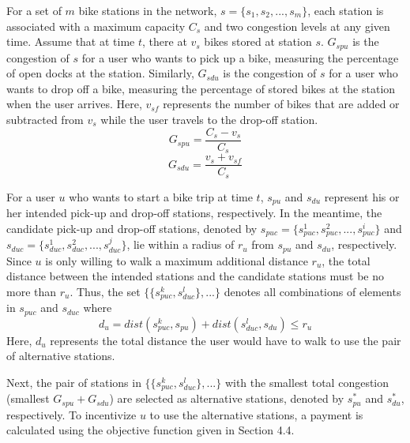 \documentclass[times, 10pt,twocolumn]{article}
\begin{document}
For a set of $m$ bike stations in the network, $s = \{s_1, s_2, ..., s_m\}$, each station is associated with a maximum capacity $C_s$ and two congestion levels at any given time. Assume that at time $t$, there at $v_s$ bikes stored at station $s$. $G_{spu}$ is the congestion of $s$ for a user who wants to pick up a bike, measuring the percentage of open docks at the station. Similarly, $G_{sdu}$ is the congestion of $s$ for a user who wants to drop off a bike, measuring the percentage of stored bikes at the station when the user arrives. Here, $v_{sf}$ represents the number of bikes that are added or subtracted from $v_s$ while the user travels to the drop-off station.
\begin{equation}
G_{spu} = \frac{C_s-v_s}{C_s}
\end{equation}
\begin{equation}
G_{sdu} = \frac{v_s+v_{sf}}{C_s}
\end{equation}

For a user $u$ who wants to start a bike trip at time $t$, $s_{pu}$ and $s_{du}$ represent his or her intended pick-up and drop-off stations, respectively. In the meantime, the candidate pick-up and drop-off stations, denoted by $s_{puc} = \{s_{puc}^1, s_{puc}^2, ..., s_{puc}^i\}$ and $s_{duc} = \{s_{duc}^1, s_{duc}^2, ..., s_{duc}^j\}$, lie within a radius of $r_u$ from $s_{pu}$ and $s_{du}$, respectively. Since $u$ is only willing to walk a maximum additional distance $r_u$, the total distance between the intended stations and the candidate stations must be no more than $r_u$. Thus, the set $\{\{s_{puc}^k,s_{duc}^l\}, ...\}$ denotes all combinations of elements in $s_{puc}$ and $s_{duc}$ where
\begin{equation}
d_u = dist(s_{puc}^k, s_{pu}) + dist(s_{duc}^l, s_{du}) \leq r_u
\end{equation}
Here, $d_u$ represents the total distance the user would have to walk to use the pair of alternative stations.

Next, the pair of stations in $\{\{s_{puc}^k,s_{duc}^l\}, ...\}$ with the smallest total congestion (smallest $G_{spu}+G_{sdu}$) are selected as alternative stations, denoted by $s_{pu}^*$ and $s_{du}^*$, respectively. To incentivize $u$ to use the alternative stations, a payment is calculated using the objective function given in Section 4.4.
\end{document}
